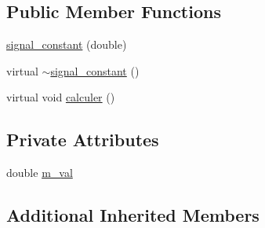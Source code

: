 \subsection*{Public Member Functions}
\begin{DoxyCompactItemize}
\item 
\hyperlink{classsignal__constant_a49639918bd5ecb949829f34703b21044}{signal\-\_\-constant} (double)
\item 
virtual \hyperlink{classsignal__constant_aa4c913cb08d9be90799b5f30fbb208fa}{$\sim$signal\-\_\-constant} ()
\item 
virtual void \hyperlink{classsignal__constant_a18edd9db48afa7b287ae363bdcd91d43}{calculer} ()
\end{DoxyCompactItemize}
\subsection*{Private Attributes}
\begin{DoxyCompactItemize}
\item 
double \hyperlink{classsignal__constant_a750ff715be3882c6838312ffddf025b8}{m\-\_\-val}
\end{DoxyCompactItemize}
\subsection*{Additional Inherited Members}


